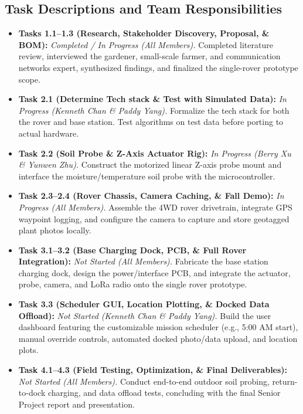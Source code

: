 \documentclass[12pt, letterpaper]{article}
\begin{document}
\subsection{Task Descriptions and Team Responsibilities}
\begin{itemize}
    \item \textbf{Tasks 1.1--1.3 (Research, Stakeholder Discovery, Proposal, \& BOM):} \textit{Completed / In Progress (All Members).} Completed literature review, interviewed the gardener, small-scale farmer, and communication networks expert, synthesized findings, and finalized the single-rover prototype scope.
    \item \textbf{Task 2.1 (Determine Tech stack \& Test with Simulated Data):} \textit{In Progress (Kenneth Chan \& Paddy Yang).} Formalize the tech stack for both the rover and base station. Test algorithms on test data before porting to actual hardware.
    \item \textbf{Task 2.2 (Soil Probe \& Z-Axis Actuator Rig):} \textit{In Progress (Berry Xu \& Yunwen Zhu).} Construct the motorized linear Z-axis probe mount and interface the moisture/temperature soil probe with the microcontroller.
    \item \textbf{Task 2.3--2.4 (Rover Chassis, Camera Caching, \& Fall Demo):} \textit{In Progress (All Members).} Assemble the 4WD rover drivetrain, integrate GPS waypoint logging, and configure the camera to capture and store geotagged plant photos locally.
    \item \textbf{Task 3.1--3.2 (Base Charging Dock, PCB, \& Full Rover Integration):} \textit{Not Started (All Members).} Fabricate the base station charging dock, design the power/interface PCB, and integrate the actuator, probe, camera, and LoRa radio onto the single rover prototype.
    \item \textbf{Task 3.3 (Scheduler GUI, Location Plotting, \& Docked Data Offload):} \textit{Not Started (Kenneth Chan \& Paddy Yang).} Build the user dashboard featuring the customizable mission scheduler (e.g., 5:00 AM start), manual override controls, automated docked photo/data upload, and location plots.
    \item \textbf{Task 4.1--4.3 (Field Testing, Optimization, \& Final Deliverables):} \textit{Not Started (All Members).} Conduct end-to-end outdoor soil probing, return-to-dock charging, and data offload tests, concluding with the final Senior Project report and presentation.
\end{itemize}
\end{document}

